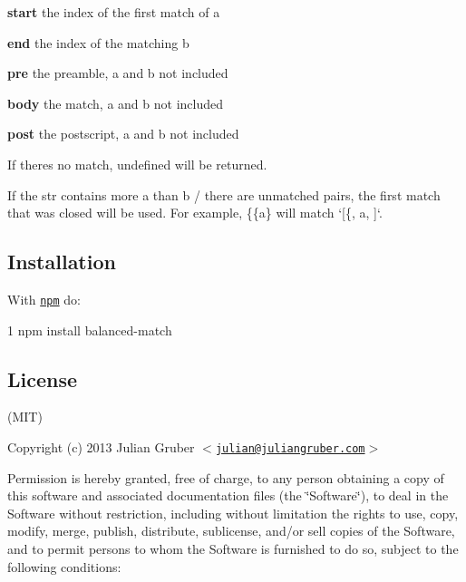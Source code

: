 \begin{DoxyItemize}
\item {\bfseries start} the index of the first match of {\ttfamily a}
\item {\bfseries end} the index of the matching {\ttfamily b}
\item {\bfseries pre} the preamble, {\ttfamily a} and {\ttfamily b} not included
\item {\bfseries body} the match, {\ttfamily a} and {\ttfamily b} not included
\item {\bfseries post} the postscript, {\ttfamily a} and {\ttfamily b} not included
\end{DoxyItemize}

If there\textquotesingle{}s no match, {\ttfamily undefined} will be returned.

If the {\ttfamily str} contains more {\ttfamily a} than {\ttfamily b} / there are unmatched pairs, the first match that was closed will be used. For example, {\ttfamily \{\{a\}} will match `\mbox{[}\textquotesingle{}\{\textquotesingle{}, \textquotesingle{}a\textquotesingle{}, \textquotesingle{}\textquotesingle{}\mbox{]}`.

\subsection*{Installation}

With \href{https://npmjs.org}{\tt npm} do\+:


\begin{DoxyCode}
1 npm install balanced-match
\end{DoxyCode}


\subsection*{License}

(M\+I\+T)

Copyright (c) 2013 Julian Gruber $<$\href{mailto:julian@juliangruber.com}{\tt julian@juliangruber.\+com}$>$

Permission is hereby granted, free of charge, to any person obtaining a copy of this software and associated documentation files (the \char`\"{}\+Software\char`\"{}), to deal in the Software without restriction, including without limitation the rights to use, copy, modify, merge, publish, distribute, sublicense, and/or sell copies of the Software, and to permit persons to whom the Software is furnished to do so, subject to the following conditions\+:

